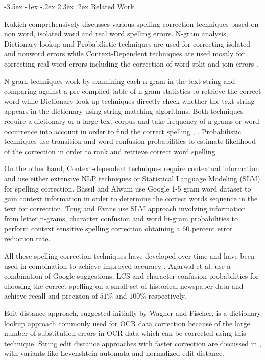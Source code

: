 \documentclass[12pt]{article}
\makeatletter
\renewcommand\section{\@startsection{section}{1}{\z@}%
                                  {-3.5ex \@plus -1ex \@minus -.2ex}%
                                  {2.3ex \@plus.2ex}%
                                  {\normalfont\bfseries}}
\makeatother
\begin{document}
\section{Related Work}
\label{spell:rw}

Kukich\cite{kukich1992techniques} comprehensively discusses various spelling correction techniques based on non word, isolated word and real word spelling errors. N-gram analysis, Dictionary lookup and Probabilistic techniques are used for correcting isolated and nonword errors while Context-Dependent techniques are used mostly for correcting real word errors including the correction of word split and join errors \cite{elmi1998spelling}.

 N-gram techniques work by examining each n-gram in the text string and comparing against a pre-compiled table of n-gram statistics to retrieve the correct word while Dictionary look up techniques directly check whether the text string appears in the dictionary using string matching algorithms. Both techniques require a dictionary or a large text corpus and take frequency of n-grams or word occurrence into account in order to find the correct spelling \cite{strohmaier2003lexical}, \cite{ringlstetter2007text}.
 Probabilistic techniques use transition and word confusion probabilities to estimate likelihood of the correction in order to rank and retrieve correct word spelling.

On the other hand, Context-dependent techniques require contextual information and use either extensive NLP techniques or Statistical Language Modeling (SLM) for spelling correction.
Bassil and Alwani\cite{bassil2012ocr} use Google 1-5 gram word dataset to gain context information in order to determine the correct words sequence in the text for correction.
Tong and Evans\cite{tong1996statistical} use SLM approach involving information from letter n-grams, character confusion and word bi-gram probabilities to perform context sensitive spelling correction obtaining a 60 percent error reduction rate. 

All these spelling correction techniques have developed over time and have been used in combination to achieve improved accuracy \cite{brill2000improved}. Agarwal et al.\cite{agarwal2013utilizing} use a combination of Google suggestions, LCS and character confusion probabilities for choosing the correct spelling on a small set of historical newspaper data and achieve recall and precision of $51\%$ and $100\%$ respectively.


Edit distance approach, suggested initially by Wagner and Fischer\cite{wagner1974string}, is a dictionary lookup approach commonly used for OCR data correction because of the large number of substitution errors in OCR data  \cite{kukich1992techniques}\cite{christen2006comparison} which can be corrected using this technique. String edit distance approaches with faster correction are discussed in \cite{marzal1993computation},\cite{schulz2002fast}  with variants like Levenshtein automata and normalized edit distance.
\end{document}
